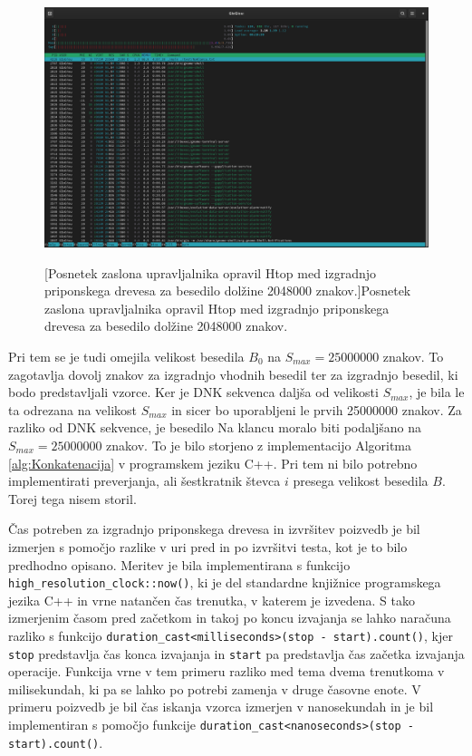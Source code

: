 \begin{figure}[tb]
    \centering
    \includegraphics[width=\textwidth]{Slike/Zaslonski posnetek 2024-12-13 11-07-45.png}

    [Posnetek zaslona upravljalnika opravil Htop med izgradnjo priponskega drevesa za besedilo dolžine 2048000 znakov.]{Posnetek zaslona upravljalnika opravil Htop med izgradnjo priponskega drevesa za besedilo dolžine 2048000 znakov.} 
    \label{fig:6GB}
\end{figure}

\newpage
Pri tem se je tudi omejila velikost besedila $B_0$ na $S_{max}=25000000$ znakov. To zagotavlja dovolj znakov za izgradnjo vhodnih besedil ter za izgradnjo besedil, ki bodo predstavljali vzorce. Ker je DNK sekvenca \cite{podatki} daljša od velikosti $S_{max}$, je bila le ta odrezana na velikost $S_{max}$ in sicer bo uporabljeni le prvih 25000000 znakov. Za razliko od DNK sekvence, je besedilo Na klancu \cite{podatkiNaKlancu} moralo biti podaljšano na $S_{max}=25000000$ znakov. To je bilo storjeno z implementacijo Algoritma \ref{alg:Konkatenacija} v programskem jeziku C++. Pri tem ni bilo potrebno implementirati preverjanja, ali šestkratnik števca $i$ presega velikost besedila $B$. Torej tega nisem storil.

Čas potreben za izgradnjo priponskega drevesa in izvršitev poizvedb je bil izmerjen s pomočjo razlike v uri pred in po izvršitvi testa, kot je to bilo predhodno opisano. Meritev je bila implementirana s funkcijo \verb|high_resolution_clock::now()|, ki je del standardne knjižnice programskega jezika C++ in vrne natančen čas trenutka, v katerem je izvedena.
S tako izmerjenim časom pred začetkom in takoj po koncu izvajanja se lahko naračuna razliko s funkcijo \verb|duration_cast<milliseconds>(stop - start).count()|, kjer \verb|stop| predstavlja čas konca izvajanja in \verb|start| pa predstavlja čas začetka izvajanja operacije. Funkcija vrne v tem primeru razliko med tema dvema trenutkoma v milisekundah, ki pa se lahko po potrebi zamenja v druge časovne enote. V primeru poizvedb je bil čas iskanja vzorca izmerjen v nanosekundah in je bil implementiran s pomočjo funkcije \verb|duration_cast<nanoseconds>(stop - start).count()|.


